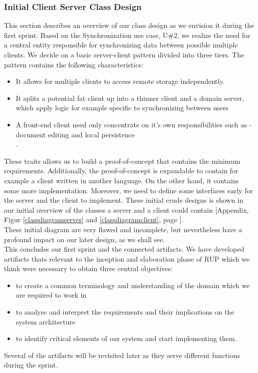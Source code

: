\subsubsection{Initial Client Server Class Design}
This section describes an overview of our class design as we envision it during the first sprint. Based on the Synchronization use case, U\#2, we realize the need for a central entity responsible for synchronizing data between possible multiple clients. We decide on a basic server-client pattern divided into three tiers. The pattern contains the following characteristics:\\
\begin{itemize}
\item It allows for multiple clients to access remote storage independently.
\item It splits a potential fat client up into a thinner client and a domain server, which apply logic for example specific to synchronizing between users
\item A front-end client need only concentrate on it's own responsibilities such as - document editing and local persistence \cite{ttda}\\.
\end{itemize}
These traits allows us to build a proof-of-concept that contains the minimum requirements. Additionally, the proof-of-concept is expandable to contain for example a client written in another language. On the other hand, it contains some more implementation. Moreover, we need to define some interfaces early for the server and the client to implement. These initial crude designs is shown in our initial overview of the classes a server and a client could contain [Appendix, Figur \ref{classdiagramserver} and \ref{classdiagramclient}, page \pageref{classdiagramserver}].\\
These initial diagram are very flawed and incomplete, but nevertheless have a profound impact on our later design, as we shall see.\\
\newline
This concludes our first sprint and the connected artifacts. We have developed artifacts thats relevant to the inception and elaboration phase of RUP which we think were necessary to obtain three central objectives:\\
\begin{itemize}
\item to create a common terminology and understanding of the domain which we are required to work in
\item to analyse and interpret the requirements and their implications on the system architecture
\item to identify critical elements of our system and start implementing them.
\end{itemize}
Several of the artifacts will be revisited later as they serve different functions during the sprint.\\